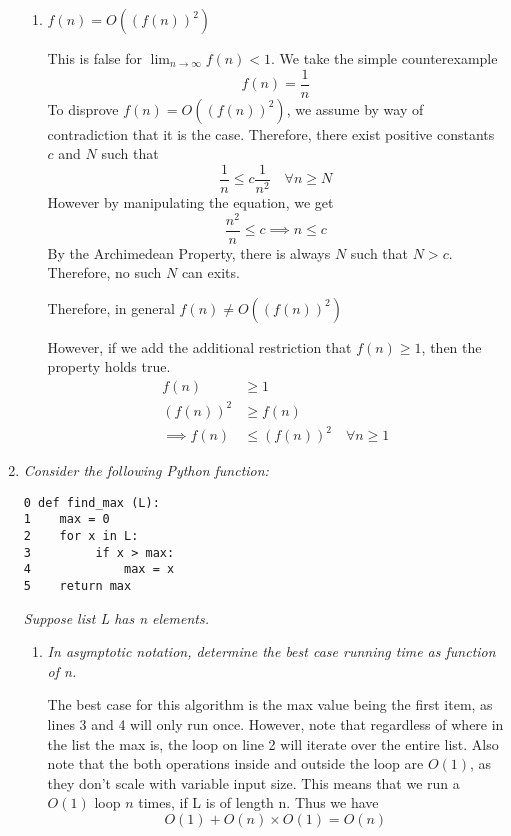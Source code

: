 \documentclass[12pt]{article}
\begin{document}
\begin{enumerate}
\begin{enumerate}
    \item \textit{$f(n) = O((f(n))^2)$}
    
    This is false for $\lim_{n\to\infty}f(n) < 1$. We take the simple counterexample
    \[
    f(n) = \frac{1}{n}
    \]
    To disprove $f(n) = O((f(n))^2)$, we assume by way of contradiction that it is the case. Therefore, there exist positive constants $c$ and $N$ such that
    \[
    \frac{1}{n} \leq c\frac{1}{n^2} \hspace{12pt} \forall n\geq N
    \]
    However by manipulating the equation, we get 
    \[
    \frac{n^2}{n} \leq c \implies n \leq c
    \]
    By the Archimedean Property, there is always $N$ such that $N>c$. Therefore, no such $N$ can exits.
    
   	Therefore, in general $\boxed{f(n) \neq O((f(n))^2)}$
    
   	However, if we add the additional restriction that $f(n) \geq 1$, then the property holds true.
    \begin{align*}
    f(n) &\geq 1\\
    (f(n))^2 &\geq f(n)\\
    \implies f(n) &\leq (f(n))^2 \hspace{12pt} \forall n\geq 1
    \end{align*}
    
    \end{enumerate}
    
    \newpage
	\item \textit{Consider the following Python function:}
    \begin{Verbatim}
0 def find_max (L):
1    max = 0
2    for x in L:
3         if x > max: 
4             max = x
5    return max
    \end{Verbatim}
    \textit{Suppose list L has n elements.}
    \begin{enumerate}
	\item \textit{In asymptotic notation, determine the best case running time as function of n.}
    
     The best case for this algorithm is the max value being the first item, as lines 3 and 4 will only run once. However, note that regardless of where in the list the max is, the loop on line 2 will iterate over the entire list. 
Also note that the both operations inside and outside the loop are $O(1)$, as they don't scale with variable input size. This means that we run a $O(1)$ loop $n$ times, if L is of length n. Thus we have
    \[
    O(1)+O(n)\times O(1) = \boxed{O(n)}
    \]\\
    

\end{enumerate}
\end{enumerate}
\end{document}
